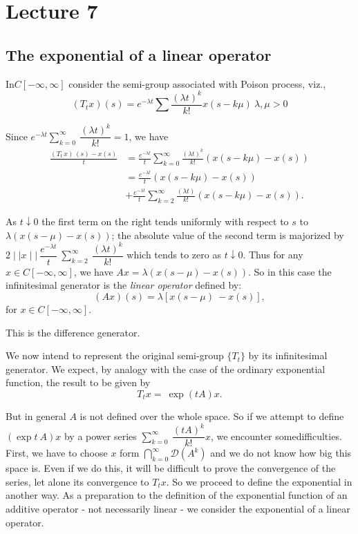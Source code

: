 \chapter{Lecture 7}\label{chap7}

\section{The exponential of a linear operator}\label{chap7:sec1}

\begin{example*}[III ]
 In\pageoriginale $C [ -\infty, \infty ] $ consider the semi-group
 associated with Poison process, viz., 
 $$
 (T_t x) (s) = e^{- \lambda t} \sum \frac{( \lambda t)^k}{k!} x ( s
 - k \mu ) ~ \lambda, \mu > 0 
 $$
\end{example*}

Since $ e^{- \lambda t} \sum \limits^{\infty}_{k=0} ~ \dfrac{(
 \lambda t)^k}{k!} = 1 $, we have 
\begin{align*}
 \frac{(T_t \,x) \,(s)-x(s)}{t} &= \frac{e^{-\lambda t}}{t}
 \sum^{\infty}_{k=0} \frac{( \lambda t)^k}{k!} ( x ( s - k \mu ) -x
 (s) ) \\ 
 &= \frac{e^{-\lambda t}}{t} ( x ( s - k \mu ) -x (s) ) \\
 &+ \frac{e^{-\lambda t}}{t} \sum^{\infty}_{k=2} \frac{( \lambda t
  )}{k!} ( x ( s - k \mu ) -x (s) ).
\end{align*}

As $t \downarrow 0 $ the first term on the right tends uniformly
with respect to $ s $ to $ \lambda ( x ( s - \mu ) - x (s) ) $; the
absolute value of the second term is majorized by $ 2 \mid\mid x
\mid\mid ~\dfrac{e^{-\lambda t}}{t} ~ \sum \limits^{\infty}_{k=2} ~
\dfrac{(\lambda t)^k}{k!}$ which tends to zero as $ t \downarrow 0
$. Thus for any $ x \in C [ - \infty, \infty ] $, we have $
Ax = \lambda ( x ( s - \mu ) - x (s) ) $. So in this case the
infinitesimal generator is the \textit{ linear operator } defined by: 
$$
( Ax ) (s) = \lambda [ x ( s-\mu ) ~ -x (s) ],
$$
for $ x \in C [ - \infty, \infty ] $.

This is the difference generator.

We now intend to represent the original semi-group $ \{ T_t \} $ by
its infinitesimal generator. We expect, by analogy with the case of
the ordinary exponential function, the result to be given by 
$$
T_t x = ~ \exp(t A) x. 
$$

But in general $A$ is not defined over the whole space. So if we
attempt to define $(\exp t ~ A)x$ by a power series $ \sum
\limits^{\infty}_{k=0} ~ \dfrac{(tA)^k}{k!} x$, we encounter
some\pageoriginale difficulties. First, we have to choose $x$ form $ \bigcap
\limits^{\infty}_{k=0} \mathscr{D} ( A^k ) $ and we do not know how
big this space is. Even if we do this, it will be difficult to prove
the convergence of the series, let alone its convergence to $T_t x$.
 So we proceed to define the exponential in another way. As a
preparation to the definition of the exponential function of an
additive operator - not necessarily linear - we consider the
exponential of a linear operator. 

